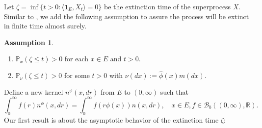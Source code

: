 \documentclass[12pt,a4paper]{amsart}
\numberwithin{equation}{section}
\theoremstyle{plain}
\theoremstyle{definition}
\newtheorem{asp}{Assumption}
\begin{document}
\begin{comment}
In the cases of $\lambda\leq 0,$ it is proved by \cite{EnglanderKyprianou2004Local} that $\lim_{t\rightarrow\infty} \langle
\mathbf 1_E,X_t\rangle=0 $ in probability.
({\bf ZS: Do we necessarily have to cite \cite{EnglanderKyprianou2004Local} here? I think
  \cite{EnglanderKyprianou2004Local} only considered the homogenious branching
  superdifussions, and it focused on the local extinction. It is hard to see
  where it proved this statement. If in our prove we don't use the result that
  $\langle \mathbf 1_E,X_t\rangle=0$, then we don't have to cite this paper
  here.}) {\color{red} I prefer to keeping this result here.} But this is not
equivalent to
\begin{equation}\label{eq:p1extinc}
	\mathbb P_\mu(\zeta<\infty)=1.
\end{equation}
If the branching mechanism $\psi$ is independent of the location $x$, then
\eqref{eq:p1extinc} holds provided condition \eqref{eq:_extinc_assump_for_continuous}
is true. 
\end{comment}
Let $\zeta=\inf\{t>0: \langle \mathbf 1_E,X_t\rangle=0\}$ be the extinction time of the superprocess $X$.
Similar to \cite{RenSongSun2019Spine,RenSongZhang2018Williams}, we add the following assumption to assure the process will be extinct in finite time almost surely.
\begin{asp} 
\label{asp:3}
~
  \begin{enumerate}
  \item \label{subsup:point_non_presistence}
    $\mathbb P_{x}(\zeta \leq t)>0$ for each $x\in E$ and $t>0$.
  \item \label{subasp:measure_non_presistence}
    $\mathbb P_{\nu}(\zeta\leq t)>0$ for some $t>0$ with $\nu(dx):=\widehat\phi(x)m(dx)$.
  \end{enumerate}
\end{asp}
\par
Define a new kernel $n^\phi(x, dr)$ from $E$ to $(0,\infty)$ such that
\begin{equation} \label{eq:phi_change}
	\int_0^\infty f(r)n^\phi(x,dr)=\int_0^\infty f(r\phi(x))n(x, dr),
	\quad x\in E, f\in \mathcal B_b((0,\infty), \mathbb R).
\end{equation}
Our first result is about the asymptotic behavior of the extinction time $\zeta$:
\end{document}
